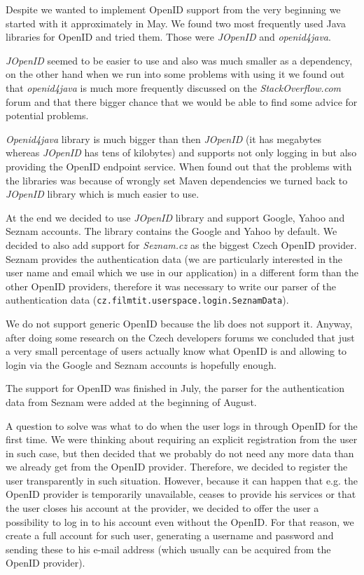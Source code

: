 Despite we wanted to implement OpenID support from the very beginning we started with it approximately in May. We found two most frequently used Java libraries for OpenID and tried them. Those were \emph{JOpenID} and \emph{openid4java}.

\emph{JOpenID} seemed to be easier to use and also was much smaller as a dependency, on the other hand when we run into some problems with using it we found out that \emph{openid4java} is much more frequently discussed on the \emph{StackOverflow.com} forum and that there bigger chance that we would be able to find some advice for potential problems.

\emph{Openid4java} library is much bigger than then \emph{JOpenID} (it has megabytes whereas \emph{JOpenID} has tens of kilobytes) and supports not only logging in but also providing the OpenID endpoint service. When found out that the problems with the libraries was because of wrongly set Maven dependencies we turned back to \emph{JOpenID} library which is much easier to use.

At the end we decided to use \emph{JOpenID} library and support Google, Yahoo and Seznam accounts. The library contains the Google and Yahoo by default. We decided to also add support for \emph{Seznam.cz} as the biggest Czech OpenID provider. Seznam provides the authentication data (we are particularly interested in the user name and email which we use in our application) in a different form than the other OpenID providers, therefore it was necessary to write our parser of the authentication data ({\tt{cz.filmtit.userspace.login.SeznamData}}).

We do not support generic OpenID because the lib does not support it. Anyway, after doing some research on the Czech developers forums we concluded that just a very small percentage of users actually know what OpenID is and allowing to login via the Google and Seznam accounts is hopefully enough.

The support for OpenID was finished in July, the parser for the authentication data from Seznam were added at the beginning of August.

A question to solve was what to do when the user logs in through OpenID for the first time. We were thinking about requiring an explicit registration from the user in such case, but then decided that we probably do not need any more data than we already get from the OpenID provider. Therefore, we decided to register the user transparently in such situation.
However, because it can happen that e.g. the OpenID provider is temporarily unavailable, ceases to provide his services or that the user closes his account at the provider, we decided to offer the user a possibility to log in to his account even without the OpenID. For that reason, we create a full account for such user, generating a username and password and sending these to his e-mail address (which usually can be acquired from the OpenID provider).

